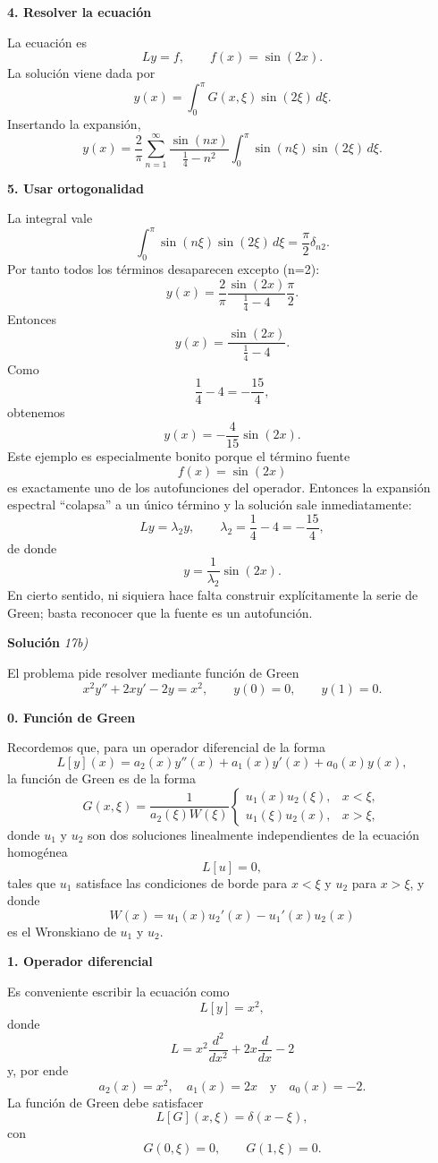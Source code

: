 \documentclass[11pt,spanish]{article}
\newcounter{problema}
\begin{document}
{\bf 4. Resolver la ecuación}

La ecuación es
$$
Ly=f,
\qquad
f(x)=\sin(2x).
$$
La solución viene dada por
$$
y(x)
=
\int_0^\pi
G(x,\xi)\sin(2\xi)\,d\xi.
$$
Insertando la expansión,
$$
y(x)
=
\frac2\pi
\sum_{n=1}^{\infty}
\frac{\sin(nx)}
{\frac14-n^2}
\int_0^\pi
\sin(n\xi)\sin(2\xi)\,d\xi.
$$

{\bf 5. Usar ortogonalidad}

La integral vale
$$
\int_0^\pi
\sin(n\xi)\sin(2\xi)\,d\xi
=
\frac{\pi}{2}\delta_{n2}.
$$
Por tanto todos los términos desaparecen excepto (n=2):
$$
y(x)
=
\frac2\pi
\frac{\sin(2x)}
{\frac14-4}
\frac{\pi}{2}.
$$
Entonces
$$
y(x)
=
\frac{\sin(2x)}
{\frac14-4}.
$$
Como
$$
\frac14-4
=
-\frac{15}{4},
$$
obtenemos
$$
\boxed{
y(x)
=
-\frac4{15}\sin(2x).
}
$$
Este ejemplo es especialmente bonito porque el término fuente
$$
f(x)=\sin(2x)
$$
es exactamente uno de los autofunciones del operador. Entonces la expansión espectral ``colapsa'' a un único término y la solución sale inmediatamente:
$$
Ly=\lambda_2 y,
\qquad
\lambda_2=\frac14-4=-\frac{15}{4},
$$
de donde
$$
y=\frac1{\lambda_2}\sin(2x).
$$
En cierto sentido, ni siquiera hace falta construir explícitamente la serie de Green; basta reconocer que la fuente es un autofunción.


\vspace{0.5cm}
{\bf Soluci\'on }{\em 17b)}
\vspace{0.5cm}


El problema pide resolver mediante función de Green
$$
x^2y''+2xy'-2y=x^2,
\qquad
y(0)=0,
\qquad
y(1)=0.
$$

{\bf 0. Funci\'on de Green}

Recordemos que, para un operador diferencial de la forma
$$
L[y](x)
=
a_2(x)
y''(x)
+
a_1(x)
y'(x)
+
a_0(x)
y(x),
$$
la funci\'on de Green es de la forma
$$
G(x,\xi)
= 
\frac{1}{a_2(\xi)W(\xi)}
\left\{
\begin{array}{ll}
u_1(x)u_2(\xi), & x<\xi, \\ 
u_1(\xi)u_2(x), & x>\xi,  
\end{array}
\right.
$$
donde $u_1$  y $u_2$ son dos soluciones linealmente independientes de la ecuaci\'on homog\'enea
$$
L[u] = 0,
$$
tales que $u_1$ satisface las condiciones de borde para $x<\xi$ y $u_2$ para $x>\xi$, y donde
$$
W(x) = u_1(x)u_2'(x) - u_1'(x)u_2(x)
$$
es el Wronskiano de $u_1$ y $u_2$.

{\bf 1. Operador diferencial}

Es conveniente escribir la ecuación como
$$
L[y]=x^2,
$$
donde
$$
L
=
x^2\frac{d^2}{dx^2}
+
2x\frac{d}{dx}
-2
$$
y, por ende
$$
a_2(x) = x^2,
\quad
a_1(x) = 2x
\quad
\text{y}
\quad
a_0(x) = -2.
$$
La función de Green debe satisfacer
$$
L[G](x,\xi)=\delta(x-\xi),
$$
con
$$
G(0,\xi)=0,
\qquad
G(1,\xi)=0.
$$
\end{document}
